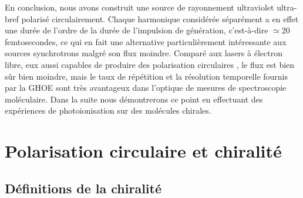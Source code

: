 En conclusion, nous avons construit une source de rayonnement ultraviolet ultra-bref polarisé circulairement. Chaque harmonique considérée séparément a en effet une durée de l'ordre de la durée de l'impulsion de génération, c'est-à-dire $\simeq 20$ femtosecondes, ce qui en fait une alternative particulièrement intéressante aux sources synchrotrons malgré son flux moindre. Comparé aux lasers à électron libre, eux aussi capables de produire des polarisation circulaires , le flux est bien sûr bien moindre, mais le taux de répétition et la résolution temporelle fournis par la GHOE sont très avantageux dans l'optique de mesures de spectroscopie moléculaire. Dans la suite nous démontrerons ce point en effectuant des expériences de photoionisation sur des molécules chirales. 
%
\chapter{Polarisation circulaire et chiralité}
\section{Définitions de la chiralité}
